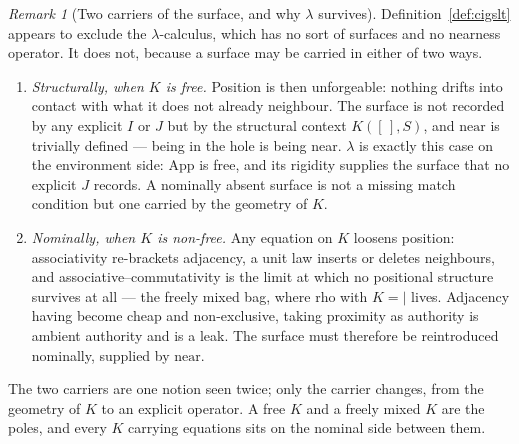 \documentclass[11pt,a4paper]{article}
\theoremstyle{definition}
\theoremstyle{plain}
\theoremstyle{remark}
\newtheorem{remark}[definition]{Remark}
\begin{document}
\begin{remark}[Two carriers of the surface, and why $\lambda$ survives]
\label{rem:regimes}
Definition~\ref{def:cigslt} appears to exclude the $\lambda$-calculus, which has no
sort of surfaces and no nearness operator. It does not, because a surface may be
carried in either of two ways.
\begin{enumerate}[label=(\alph*),leftmargin=2.0em]
\item \emph{Structurally, when $K$ is free.} Position is then unforgeable: nothing
drifts into contact with what it does not already neighbour. The surface is not
recorded by any explicit $I$ or $J$ but by the structural context $K([\,],S)$, and
$\mathrm{near}$ is trivially defined --- being in the hole is being near. $\lambda$ is
exactly this case on the environment side: $\mathrm{App}$ is free, and its rigidity
supplies the surface that no explicit $J$ records. A nominally absent surface is not
a missing match condition but one carried by the geometry of $K$.
\item \emph{Nominally, when $K$ is non-free.} Any equation on $K$ loosens position:
associativity re-brackets adjacency, a unit law inserts or deletes neighbours, and
associative--com\-mu\-ta\-tiv\-i\-ty is the limit at which no positional structure
survives at all --- the freely mixed bag, where rho with $K = {\mid}$ lives. Adjacency having
become cheap and non-exclusive, taking proximity as authority is ambient authority
and is a leak. The surface must therefore be reintroduced nominally, supplied by
$\mathrm{near}$.
\end{enumerate}
The two carriers are one notion seen twice; only the carrier changes, from the
geometry of $K$ to an explicit operator. A free $K$ and a freely mixed $K$ are the
poles, and every $K$ carrying equations sits on the nominal side between them.
\end{remark}
\end{document}
